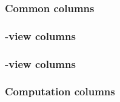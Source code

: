 \subsubsection{Common            columns \lispTodo{}}    \label{user txn data: generalities: columns: common}          
\subsubsection{\hubMod{}-view    columns \lispTodo{}}    \label{user txn data: generalities: columns: hub view}        
\subsubsection{\rlpTxnMod{}-view columns \lispTodo{}}    \label{user txn data: generalities: columns: rlp view}        
\subsubsection{Computation       columns \lispTodo{}}    \label{user txn data: generalities: columns: computation}     
